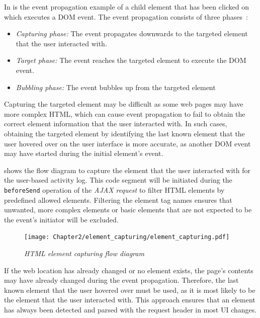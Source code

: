 In  is the event propagation example of a child element that has been clicked on which executes a DOM event. The event propagation consists of three phases~\cite{EventBubbling}:

\begin{itemize}
	\item \textit{Capturing phase:} The event propagates downwards to the targeted element that the user interacted with.
	\item \textit{Target phase:} The event reaches the targeted element to execute the DOM event.
	\item \textit{Bubbling phase:} The event bubbles up from the targeted element
\end{itemize}

Capturing the targeted element may be difficult as some web pages may have more complex HTML, which can cause event propagation to fail to obtain the correct element information that the user interacted with. In such cases, obtaining the targeted element by identifying the last known element that the user hovered over on the user interface is more accurate, as another DOM event may have started during the initial element's event.\par {} shows the flow diagram to capture the element that the user interacted with for the user-based activity log. This code segment will be initiated during the \texttt{beforeSend} operation of the \textit{AJAX request} to filter HTML elements by predefined allowed elements. Filtering the element tag names ensures that unwanted, more complex elements or basic elements that are not expected to be the event's initiator will be excluded. 

\begin{figure}[!htb]
	\centering %
	\texttt{[image: Chapter2/element\_capturing/element\_capturing.pdf]}
	\caption[HTML element capturing flow diagram]
	{\textit{HTML element capturing flow diagram}}\label{fig:ch3_element_event_capturing}
\end{figure}

If the web location has already changed or no element exists, the page's contents may have already changed during the event propagation. Therefore, the last known element that the user hovered over must be used, as it is most likely to be the element that the user interacted with. This approach ensures that an element has always been detected and parsed with the request header in most UI changes.

